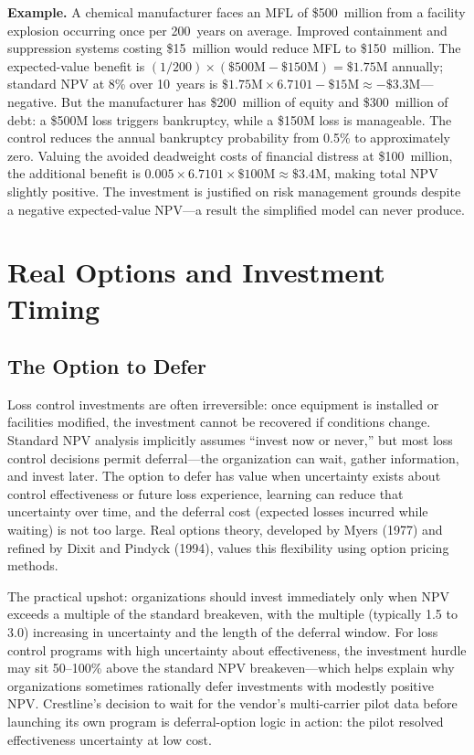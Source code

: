 \documentclass[11pt,openany]{book}
\begin{document}
\textbf{Example.} A chemical manufacturer faces an MFL of \$500~million from a
facility explosion occurring once per 200~years on average. Improved
containment and suppression systems costing \$15~million would reduce MFL to
\$150~million. The expected-value benefit is
\((1/200) \times (\$500\text{M} - \$150\text{M}) = \$1.75\text{M}\) annually;
standard NPV at 8\% over 10~years is
\(\$1.75\text{M} \times 6.7101 - \$15\text{M} \approx -\$3.3\text{M}\)---negative.
But the manufacturer has \$200~million of equity and \$300~million of debt: a
\$500M loss triggers bankruptcy, while a \$150M loss is manageable. The
control reduces the annual bankruptcy probability from 0.5\% to approximately
zero. Valuing the avoided deadweight costs of financial distress at
\$100~million, the additional benefit is
\(0.005 \times 6.7101 \times \$100\text{M} \approx \$3.4\text{M}\), making
total NPV slightly positive. The investment is justified on risk management
grounds despite a negative expected-value NPV---a result the simplified model
can never produce.

\section{Real Options and Investment Timing}
\label{sec:appendix-options}

\subsection{The Option to Defer}

Loss control investments are often irreversible: once equipment is installed
or facilities modified, the investment cannot be recovered if conditions
change. Standard NPV analysis implicitly assumes ``invest now or never,'' but
most loss control decisions permit deferral---the organization can wait,
gather information, and invest later. The option to defer has value when
uncertainty exists about control effectiveness or future loss experience,
learning can reduce that uncertainty over time, and the deferral cost
(expected losses incurred while waiting) is not too large. Real options
theory, developed by Myers (1977) and refined by Dixit and Pindyck (1994),
values this flexibility using option pricing methods.

The practical upshot: organizations should invest immediately only when NPV
exceeds a multiple of the standard breakeven, with the multiple (typically 1.5
to 3.0) increasing in uncertainty and the length of the deferral window. For
loss control programs with high uncertainty about effectiveness, the
investment hurdle may sit 50--100\% above the standard NPV breakeven---which
helps explain why organizations sometimes rationally defer investments with
modestly positive NPV. Crestline's decision to wait for the vendor's
multi-carrier pilot data before launching its own program is deferral-option
logic in action: the pilot resolved effectiveness uncertainty at low cost.
\end{document}
